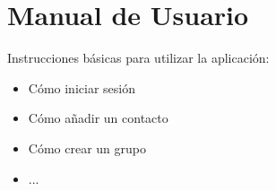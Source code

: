 \chapter{Manual de Usuario}

Instrucciones básicas para utilizar la aplicación:
\begin{itemize}
    \item Cómo iniciar sesión
    \item Cómo añadir un contacto
    \item Cómo crear un grupo
    \item ...
\end{itemize}
